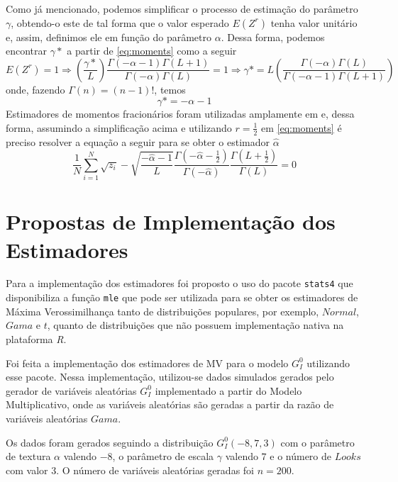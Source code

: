 \documentclass[12pt]{article}
\begin{document}
Como já mencionado, podemos simplificar o processo de estimação do parâmetro $\gamma$, obtendo-o este de tal forma que o valor esperado $E(Z^r)$ tenha valor unitário e, assim, definimos ele em função do parâmetro $\alpha$. Dessa forma, podemos encontrar $\gamma*$ a partir de \eqref{eq:moments} como a seguir
\begin{equation}
    E(Z^r) = 1 \Rightarrow \left (\frac{\gamma*}{L}\right ) \frac{\Gamma(-\alpha-1)\Gamma(L+1)}{\Gamma(-\alpha)\Gamma(L)} = 1 \Rightarrow \gamma* = L\left ( \frac{\Gamma(-\alpha)\Gamma(L)}{\Gamma(-\alpha-1)\Gamma(L+1)} \right ) 
\end{equation}
onde, fazendo $\Gamma(n) = (n-1)!$, temos
\begin{equation}
    \gamma* = -\alpha - 1
\end{equation}
Estimadores de momentos fracionários foram utilizadas amplamente em \citet{Clutter1997} e, dessa forma, assumindo a simplificação acima e utilizando $r=\frac{1}{2}$  em \eqref{eq:moments} é preciso resolver a equação a seguir para se obter o estimador $\widehat{\alpha}$
\begin{equation}
    \frac{1}{N}\sum_{i=1}^{N}\sqrt{z_i}-\sqrt{\frac{-\widehat{\alpha} - 1}{L}}\frac{\Gamma(-\widehat{\alpha} - \frac{1}{2})}{\Gamma(-\widehat{\alpha})}\frac{\Gamma(L+\frac{1}{2})}{\Gamma(L)} = 0
\end{equation}

\section{Propostas de Implementação dos Estimadores}

Para a implementação dos estimadores foi proposto o uso do pacote \texttt{stats4} que disponibiliza a função \texttt{mle} que pode ser utilizada para se obter os estimadores de Máxima Verossimilhança tanto de distribuições populares, por exemplo, $Normal$, $Gama$ e $t$, quanto de distribuições que não possuem implementação nativa na plataforma \textit{R}.

Foi feita a implementação dos estimadores de MV para o modelo $G_I^0$ utilizando esse pacote. Nessa implementação, utilizou-se dados simulados gerados pelo gerador de variáveis aleatórias $G_I^0$ implementado a partir do Modelo Multiplicativo, onde as variáveis aleatórias são geradas a partir da razão de variáveis aleatórias $Gama$.

Os dados foram gerados seguindo a distribuição $G_I^0(-8, 7, 3)$ com o parâmetro de textura $\alpha$ valendo $-8$, o parâmetro de escala $\gamma$ valendo $7$ e o número de $Looks$ com valor 3. O número de variáveis aleatórias geradas foi $n = 200$.
\end{document}
